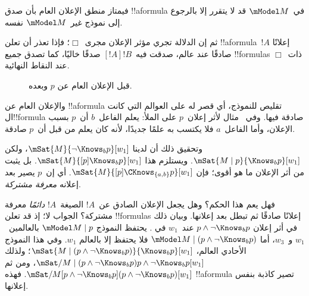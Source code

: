 \documentclass[../../../include/open-logic-section]{subfiles}
\begin{document}
فيمتاز منطق الإعلان العام بأن صدق !!a{formula} في~$\mModel M$ قد لا
يتقرر إلا بالرجوع إلى نموذج غير~$\mModel M$ نفسه.

ثم إن الدلالة تجري مؤثر الإعلان مجرى~$\Box$؛ فإذا تعذر أن تعلن
!!a{formula}~$!A$ إعلانًا صادقًا عند عالم، صدقت فيه~$[!A]!B$ صدقًا
خاليًا، كما تصدق جميع !!{formula}s ذات~$\Box$ عند النقاط النهائية.

\begin{figure}
  \begin{center}
  \end{center}
  \caption{قبل الإعلان العام عن $p$ وبعده.}
\end{figure}

والإعلان العام عن !!a{formula} تقليص للنموذج، أي قصر له على العوالم
التي كانت ال!!{formula} صادقة فيها. وفي~
مثال لأثر إعلان~$p$ على الملأ: يعلم الفاعل~$b$ أن~$p$ بسبب الإعلان،
وأما الفاعل~$a$ فلا يكتسب به علمًا جديدًا، لأنه كان يعلم من قبل أن~$p$
صادقة.

وتحقيق ذلك أن لدينا $\mSat{M}{\lnot \Knows_b p}[w_1]$، ولكن
$\mSat{M \mid p}{\Knows_b p}[w_1]$. ويستلزم هذا
$\mSat{M}{[p] \Knows_b p}[w_1]$. بل يثبت من أثر الإعلان ما هو أقوى؛ فإن
$\mSat{M}{[p]\CKnows_{\{a,b\}} p}[w_1]$. أي إن~$p$ يصير بعد إعلانه
\emph{معرفة مشتركة}.

فهل يعم هذا الحكم؟ وهل يجعل الإعلان الصادق عن~$!A$ الصيغة~$!A$
\emph{دائمًا} معرفة مشتركة؟ الجواب لا؛ إذ قد تعلن !!{formula}s إعلانًا
صادقًا ثم تبطل بعد إعلانها. وبيان ذلك في أثر إعلان
$p \land \lnot \Knows_b p$ عند~$w_1$ في
. يحتفظ النموذج $\mModel M \mid p$
بالعالمين~$w_1$ و~$w_3$، أما
$\mModel M \mid (p \land \lnot \Knows_b p)$ فلا يحتفظ إلا بالعالم
$w_1$. وفي هذا النموذج الأحادي العالم،
$\mSat{M \mid (p \land \lnot \Knows_b p)}{\Knows_b p}[w_1]$؛ ولذلك
$\mSat/{M \mid (p \land \lnot \Knows_b p)}{p \land \lnot \Knows_b p}[w_1]$،
ومن ثم
$\mSat/{M}{[p \land \lnot \Knows_b p](p \land \lnot \Knows_b p)}[w_1]$.
فهذه !!a{formula} تصير كاذبة بنفس إعلانها.
\end{document}
